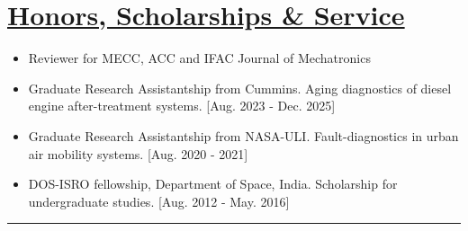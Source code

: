 \section*{\underline{Honors, Scholarships \& Service}}
\begin{itemize}
        \item Reviewer for MECC, ACC and IFAC Journal of Mechatronics
        \item Graduate Research Assistantship from Cummins. Aging diagnostics of diesel engine after-treatment systems.
        [{Aug. 2023 - Dec. 2025}]
        \item Graduate Research Assistantship from NASA-ULI. Fault-diagnostics in urban air mobility systems.
        [{Aug. 2020 - 2021}]
        \item DOS-ISRO fellowship, Department of Space, India. Scholarship for undergraduate studies.
        [{Aug. 2012 - May. 2016}]
\end{itemize}
\noindent\rule{\textwidth}{0.4pt}
